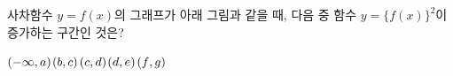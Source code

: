 사차함수 $y=f(x)$의 그래프가 아래 그림과 같을 때, 다음 중 함수 $y=\{f(x)\}^2$이 증가하는 구간인 것은?
\par\smallskip\begin{center}\resizebox{\ifdim\width>\linewidth\linewidth\else\width\fi}{!}{}\end{center}
\begin{choices32}{$(-\infty{,}\mkern3mu\mathopen{}a)$}{$(b{,}\mkern3mu\mathopen{}c)$}{$(c{,}\mkern3mu\mathopen{}d)$}{$(d{,}\mkern3mu\mathopen{}e)$}{$(f{,}\mkern3mu\mathopen{}g)$}\end{choices32}
